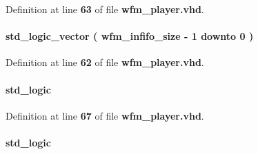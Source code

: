 Definition at line {\bf 63} of file {\bf wfm\+\_\+player.\+vhd}.

\paragraph[{wfm\+\_\+infifo\+\_\+rdusedw}]{ {\bfseries \textcolor{comment}{std\+\_\+logic\+\_\+vector}\textcolor{vhdlchar}{ }\textcolor{vhdlchar}{(}\textcolor{vhdlchar}{ }\textcolor{vhdlchar}{ }\textcolor{vhdlchar}{ }\textcolor{vhdlchar}{ }{\bfseries {\bf wfm\+\_\+infifo\+\_\+size}} \textcolor{vhdlchar}{-\/}\textcolor{vhdlchar}{ } \textcolor{vhdldigit}{1} \textcolor{vhdlchar}{ }\textcolor{keywordflow}{downto}\textcolor{vhdlchar}{ }\textcolor{vhdlchar}{ } \textcolor{vhdldigit}{0} \textcolor{vhdlchar}{ }\textcolor{vhdlchar}{)}\textcolor{vhdlchar}{ }} \hspace{0.3cm}{\ttfamily [Signal]}}\label{classwfm__player_1_1arch_a7b2d80aeb570d234c2b3e5e059fc8755}


Definition at line {\bf 62} of file {\bf wfm\+\_\+player.\+vhd}.

\paragraph[{wfm\+\_\+load\+\_\+wcmd0}]{ {\bfseries \textcolor{comment}{std\+\_\+logic}\textcolor{vhdlchar}{ }} \hspace{0.3cm}{\ttfamily [Signal]}}\label{classwfm__player_1_1arch_ae0e0a347348caa2d68bda3481acd76da}


Definition at line {\bf 67} of file {\bf wfm\+\_\+player.\+vhd}.

\paragraph[{wfm\+\_\+load\+\_\+wcmd1}]{ {\bfseries \textcolor{comment}{std\+\_\+logic}\textcolor{vhdlchar}{ }} \hspace{0.3cm}{\ttfamily [Signal]}}\label{classwfm__player_1_1arch_a0070076c5048c3d419bed09d17abc0da}



